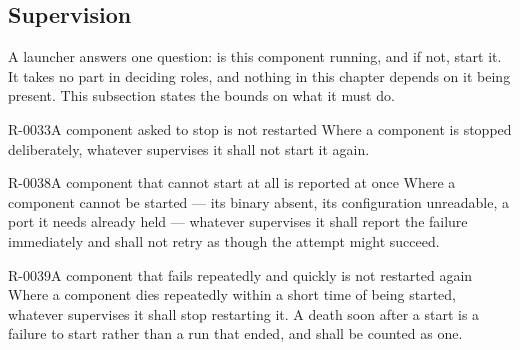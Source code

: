 \subsection{Supervision}
\label{sec:ha:disabled:supervision}

A launcher answers one question: is this component running, and if not, start it.
It takes no part in deciding roles, and nothing in this chapter depends on it
being present. This subsection states the bounds on what it must do.

\begin{requirement}{R-0033}{A component asked to stop is not restarted}
  Where a component is stopped deliberately, whatever supervises it shall not
  start it again.
\end{requirement}

\begin{requirement}{R-0038}{A component that cannot start at all is reported at once}
  Where a component cannot be started --- its binary absent, its configuration
  unreadable, a port it needs already held --- whatever supervises it shall
  report the failure immediately and shall not retry as though the attempt might
  succeed.
\end{requirement}

\begin{requirement}{R-0039}{A component that fails repeatedly and quickly is not restarted again}
  Where a component dies repeatedly within a short time of being started,
  whatever supervises it shall stop restarting it. A death soon after a start is
  a failure to start rather than a run that ended, and shall be counted as one.
\end{requirement}

